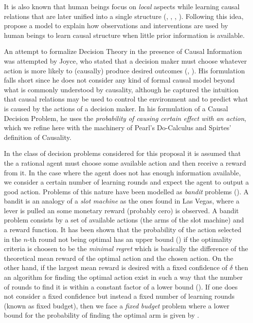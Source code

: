 \documentclass[english,letterpaper,12pt,final]{article}
\theoremstyle{definition}
\begin{document}
It is also known that human beings focus on \textit{local} aspects while learning causal relations that are later unified into a single structure (\cite{fernbach2009causal}, \cite{waldmann2008causal}, \cite{wellen2012learning}, \cite{danks2014unifying}). Following this idea, \cite{wellen2012learning} propose a model to explain how observations  and interventions are used by human beings to learn causal structure when little prior information is available. 

An attempt to formalize Decision Theory in the presence of Causal Information was attempted by Joyce, who stated that a decision maker must choose whatever action is more likely to (causally) produce desired outcomes (\cite{joyce1999foundations}, \cite{peterson2017introduction}). His formulation falls short since he does not consider any kind of formal causal model beyond what is commonly understood by causality, although he captured the intuition that causal relations may be used to control the environment and to predict what is caused by the actions of a decision maker. In his formulation of a Causal Decision Problem, he uses the \textit{probability of causing certain effect with an action}, which we refine here with the machinery of Pearl's Do-Calculus and Spirtes' definition of Causality. 

In the class of decision problems considered for this proposal it is assumed that the a rational agent must choose some available action and then receive a reward from it. In the case where the agent does not has enough information available, we consider a certain number of learning rounds and expect the agent to output a good action. Problems of this nature have been modelled as \textit{bandit} problems (\cite{sutton1998reinforcement}). A bandit is an analogy of a \textit{slot machine} as the ones found in Las Vegas, where a lever is pulled an some monetary reward (probably cero) is observed. A bandit problem consists by a set of available actions (the arms of the slot machine) and a reward function. It has been shown that the probability of the action selected in the $n$-th round not being optimal has an upper bound (\cite{audibert2010best}) if the optimality criteria is choosen to be the \textit{minimal regret} which is basically the difference of the theoretical mean reward of the optimal action and the chosen action. On the other hand, if the largest mean reward is desired with a fixed confidence of $\delta$ then an algorithm for finding the optimal action exist in such a way that the number of rounds to find it is within a constant factor of a lower bound (\cite{jamieson2014lil}).  If one does not consider a fixed confidence but instead a fixed number of learning rounds (known as fixed budget), then we face a \textit{fixed budget} problem where a lower bound for the probability of finding the optimal arm is given by \cite{carpentier2016tight}.
\end{document}

